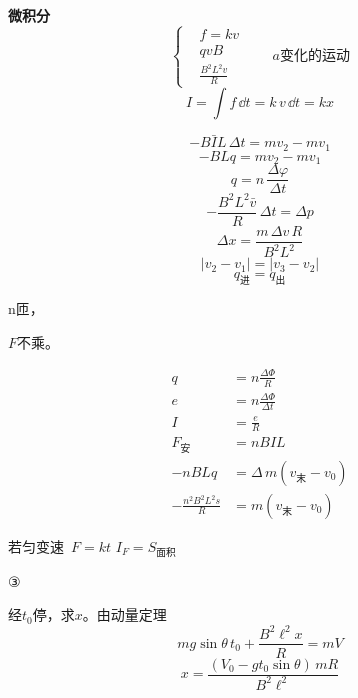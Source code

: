 \textbf{微积分}
\[
\left\{\begin{aligned}
&f=kv\\
&qvB\\
&\frac{B^2L^2v}{R}
\end{aligned}\right.
\qquad a\text{变化的运动}
\]
\[
I=\int f\,\dd t=k\,v\,\dd t=kx
\]

\[ -B\bar{I}L\,\Delta t=mv_2-mv_1 \]
\[ -BLq=mv_2-mv_1 \]
\[ q=n\,\frac{\Delta\varphi}{\Delta t} \]%
\[ -\frac{B^2L^2\bar{v}}{R}\,\Delta t=\Delta p \]
\[ \Delta x=\frac{m\,\Delta v\,R}{B^2L^2} \]
\[ |v_2-v_1|=|v_3-v_2| \]
\[ q_{\text{进}}=q_{\text{出}} \]


n匝，%

$F$不乘\unclear{$\Phi$}。%


\begin{align*}
q&=n\frac{\Delta\Phi}{R}\\
e&=n\frac{\Delta\Phi}{\Delta t}\\
I&=\frac{e}{R}\\
F_{\text{安}}&=nBIL\\
-nBLq&=\Delta\, m(v_{\text{末}}-v_0)\\ %
-\frac{n^2B^2L^2s}{R}&=m(v_{\text{末}}-v_0)
\end{align*}

若匀变速\ $F=kt$
$I_F=S_{\text{面积}}$

③

经$t_0$停，求$x$。由动量定理
\[ mg\sin\theta\,t_0+\frac{B^2\ell^2x}{R}=mV \]
\[ x=\frac{(V_0-gt_0\sin\theta)\,mR}{B^2\ell^2} \]

